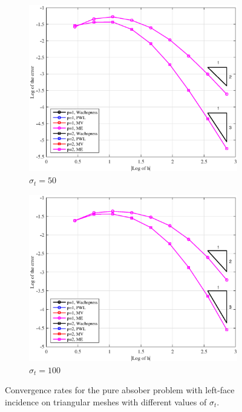 \begin{figure}
{}
\vspace{1cm}
{
	\begin{subfigure}[b]{0.485\textwidth}
		\centering
		\label{subfig::PA_Left_Tri_sig50}
		\includegraphics[width=\textwidth]{figures/sec_BF/PAErr_Left_Tri_sig50.eps}
	\caption{$\sigma_t = 50$}
	\end{subfigure}
	\hfill
	\begin{subfigure}[b]{0.485\textwidth}
		\centering
		\label{subfig::PA_Left_Tri_sig100}
		\includegraphics[width=\textwidth]{figures/sec_BF/PAErr_Left_Tri_sig100.eps}
	\caption{$\sigma_t = 100$}
	\end{subfigure}
}
\caption{Convergence rates for the pure absober problem with left-face incidence on triangular meshes with different values of $\sigma_t$.}
\label{fig::BF_Results_PA_Left_Tri}
\end{figure}

